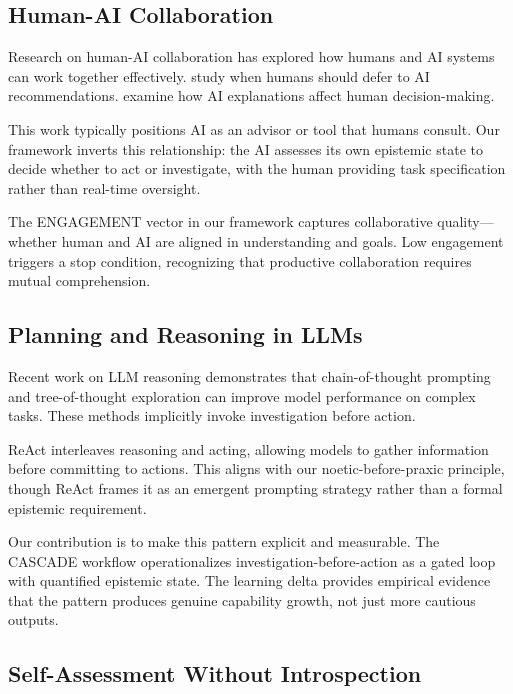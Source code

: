 \subsection{Human-AI Collaboration}

Research on human-AI collaboration has explored how humans and AI systems can work together effectively. \citet{bansal2021does} study when humans should defer to AI recommendations. \citet{lai2021towards} examine how AI explanations affect human decision-making.

This work typically positions AI as an advisor or tool that humans consult. Our framework inverts this relationship: the AI assesses its own epistemic state to decide whether to act or investigate, with the human providing task specification rather than real-time oversight.

The ENGAGEMENT vector in our framework captures collaborative quality---whether human and AI are aligned in understanding and goals. Low engagement triggers a stop condition, recognizing that productive collaboration requires mutual comprehension.

\subsection{Planning and Reasoning in LLMs}

Recent work on LLM reasoning \citep{wei2022chain,yao2023tree} demonstrates that chain-of-thought prompting and tree-of-thought exploration can improve model performance on complex tasks. These methods implicitly invoke investigation before action.

ReAct \citep{yao2023react} interleaves reasoning and acting, allowing models to gather information before committing to actions. This aligns with our noetic-before-praxic principle, though ReAct frames it as an emergent prompting strategy rather than a formal epistemic requirement.

Our contribution is to make this pattern explicit and measurable. The CASCADE workflow operationalizes investigation-before-action as a gated loop with quantified epistemic state. The learning delta provides empirical evidence that the pattern produces genuine capability growth, not just more cautious outputs.

\subsection{Self-Assessment Without Introspection}

